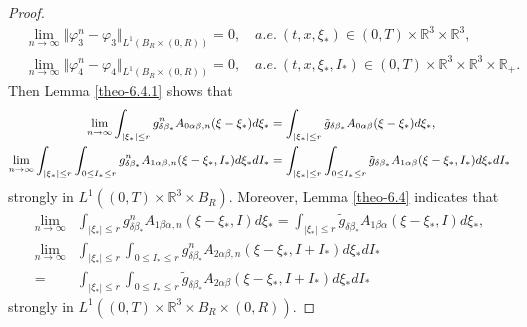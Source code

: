 \documentclass[reqno,11pt]{amsart}
\numberwithin{equation}{section}
\def\R{\mathbb{R}}
\begin{document}
\begin{proof}
\begin{equation*}
\begin{aligned}
		& \lim \limits_{n\rightarrow \infty } \Vert \varphi^n_3 -\varphi_3 \Vert_{L^1(B_R\times (0,R))}=0, \quad a.e. \ (t,x,\xi_*) \in (0,T)\times \R^3 \times \R^3, \\
		& \lim \limits_{n\rightarrow \infty } \Vert \varphi^n_4 -\varphi_4 \Vert_{L^1(B_R\times (0,R) )}=0, \quad a.e. \ (t,x,\xi_* ,I_*) \in (0,T)\times \R^3 \times \R^3 \times \R_+ . 
	\end{aligned}
\end{equation*}
Then Lemma \ref{theo-6.4.1} shows that
\begin{equation*}{\small
	\begin{aligned}
		\lim \limits_{n\rightarrow \infty } \int_{|\xi_* |\leq r} g^n_{\delta \beta_* } A_{0\alpha \beta ,n}(\xi -\xi_* ) d\xi_* &=\int_{|\xi_* |\leq r} \tilde{g}_{\delta \beta_*} A_{0\alpha \beta } (\xi -\xi_* )d\xi_*, \\
		\lim \limits_{n\rightarrow \infty } \int_{|\xi_* |\leq r} \int_{0\leq I_* \leq r} g^n_{\delta \beta_*} A_{1\alpha \beta ,n}(\xi -\xi_* ,I_* ) d\xi_* dI_*&=\int_{|\xi_* |\leq r} \int_{0\leq I_* \leq r} \tilde{g}_{\delta \beta_*} A_{1\alpha \beta } (\xi -\xi_* ,I_* )d\xi_* dI_*
	\end{aligned}}
\end{equation*}
strongly in $L^1((0,T)\times \R^3 \times B_R )$. Moreover, Lemma \ref{theo-6.4} indicates that
\begin{equation*}
	\begin{aligned}
		\lim \limits_{n\rightarrow \infty } &\int_{|\xi_* |\leq r} g^n_{\delta \beta_*} A_{1\beta \alpha ,n}(\xi -\xi_* ,I) d\xi_* =\int_{|\xi_* |\leq r} \tilde{g}_{\delta \beta_*} A_{1\beta \alpha }(\xi -\xi_* ,I) d\xi_*, \\
		\lim \limits_{n\rightarrow \infty } &\int_{|\xi_* |\leq r} \int_{0\leq I_* \leq r} g^n_{\delta \beta_*} A_{2\alpha \beta ,n}(\xi -\xi_* ,I+I_* ) d\xi_* dI_*\\
		=&\int_{|\xi_* |\leq r} \int_{0\leq I_* \leq r} \tilde{g}_{\delta \beta_*} A_{2\alpha \beta }(\xi -\xi_* ,I+I_* ) d\xi_* dI_*
	\end{aligned}
\end{equation*}
strongly in $L^1((0,T)\times \R^3 \times B_R \times (0,R))$.


\end{proof}
\end{document}
